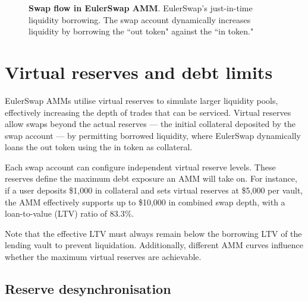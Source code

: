 \documentclass{article}
\begin{document}
\bigskip
\begin{figure}[h]
    \centering
    \caption{\textbf{Swap flow in EulerSwap AMM}. EulerSwap’s just-in-time liquidity borrowing. The swap account dynamically increases liquidity by borrowing the ``out token" against the ``in token."}
    \label{fig:EulerSwap_liquidity}
\end{figure}

\section{Virtual reserves and debt limits}

EulerSwap AMMs utilise virtual reserves to simulate larger liquidity pools, effectively increasing the depth of trades that can be serviced. Virtual reserves allow swaps beyond the actual reserves --- the initial collateral deposited by the swap account --- by permitting borrowed liquidity, where EulerSwap dynamically loans the out token using the in token as collateral.

Each swap account can configure independent virtual reserve levels. These reserves define the maximum debt exposure an AMM will take on. For instance, if a user deposits \$1,000 in collateral and sets virtual reserves at \$5,000 per vault, the AMM effectively supports up to \$10,000 in combined swap depth, with a loan-to-value (LTV) ratio of 83.3\%. 

Note that the effective LTV must always remain below the borrowing LTV of the lending vault to prevent liquidation. Additionally, different AMM curves influence whether the maximum virtual reserves are achievable.

\subsection{Reserve desynchronisation}
\end{document}
